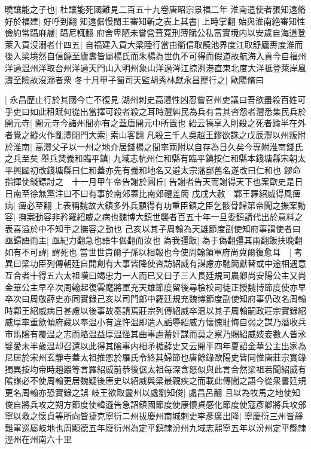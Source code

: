 曉讓能之子也|{
	杜讓能死國難見二百五十九卷唐昭宗景福二年}
淮南遣使者張知遠脩好於福建|{
	好呼到翻}
知遠倨慢閩王審知斬之表上其書|{
	上時掌翻}
始與淮南絶審知性儉約常躡麻屨|{
	躡尼輒翻}
府舍卑陋未嘗營葺寛刑薄賦公私富實境内以安歲自海道登萊入貢沒溺者什四五|{
	自福建入貢大梁陸行當由衢信取饒池界度江取舒廬夀度淮而後入梁境然自信饒至廬夀皆屬楊氏而朱楊為世仇不可得而假道故航海入貢今自福州洋過温州洋取台州洋過天門山入明州象山洋過涔江掠洌港直東北度大洋抵登萊岸風濤至險故沒溺者衆}
冬十月甲子蜀司天監胡秀林獻永昌歷行之|{
	歐陽脩曰}


|{
	永昌歷止行於其國今亡不復見}
湖州刺史高灃性凶忍嘗召州吏議曰吾欲盡殺百姓可乎吏曰如此租賦何從出當擇可殺者殺之耳時灃糾民為兵有言其咨怨者灃悉集民兵於開元寺|{
	開元寺今諸州間亦有之蓋唐開元中所置也}
紿云犒享入則殺之死者踰半在外者覺之縱火作亂灃閉門大索|{
	索山客翻}
凡殺三千人吳越王鏐欲誅之戊辰灃以州叛附於淮南|{
	高灃父子以一州之地介居錢楊之間率兩附以自存為日久矣今專附淮南錢氏之兵至矣}
舉兵焚義和臨平鎮|{
	九域志杭州仁和縣有臨平鎮按仁和縣本錢塘縣宋朝太平興國初改錢塘縣曰仁和蓋亦先有義和地名又避太宗藩邸舊名遂改曰仁和也}
鏐命指揮使錢鏢討之　十一月甲午帝告謝於圓丘|{
	告謝者告天而謝得天下也案歐史是日日南至徐無黨注曰不曰有事於南郊蓋比南郊禮差簡}
戊戌大赦　鄴王羅紹威得風痺病|{
	痺必至翻}
上表稱魏故大鎮多外兵願得有功重臣鎮之臣乞骸骨歸第帝聞之撫案動容|{
	撫案動容非矜羅紹威之病也魏博大鎮世襲者百五十年一旦委鎮請代出於意料之表喜溢於中不知手之撫容之動也}
己亥以其子周翰為天雄節度副使知府事謂使者曰亟歸語而主|{
	亟紀力翻急也語牛倨翻而汝也}
為我彊飯|{
	為于偽翻彊其兩翻飯扶晚翻}
如有不可諱|{
	謂死也}
當世世貴爾子孫以相報也今使周翰領軍府尚冀爾復愈耳　|{
	考異曰梁功臣列傳朝廷自開創有大事皆降使咨訪紹威有謀慮亦馳簡獻替或中途相遇意互合者十得五六太祖嘆曰竭忠力一人而已又曰子三人長廷規司農卿尚安陽公主又尚金華公主早卒次周翰起復雲麾將軍充天雄節度留後尋檢校司徒正授魏博節度使亦早卒次曰周敬薛史亦同實錄己亥以司門郎中羅廷規充魏博節度副使知府事仍改名周翰時鄴王紹威病日甚慮以後事故奏請焉莊宗列傳紹威卒温以其子周翰嗣政莊宗實錄紹威厚率重歛傾府藏以奉温小有違忤温即遣人詬辱紹威方懷愧耻悔自弱之謀乃潛收兵市馬隂有覆温之志而賂温益厚温怪其曲事慮蓄奸謀而莫之察乃賜紹威妓妾數人皆氶嬖愛未半歲温却召還以此得其隂事内相矛楯薛史又云開平四年夏詔金華公主出家為尼居於宋州玄靜寺蓋太祖推恩於羅氏令終其婦節也唐餘錄歐陽史皆同惟唐莊宗實錄獨異按均帝時趙巖等言羅紹威前恭後倨太祖每深含怒似與此言合然梁祖若聞紹威有隂謀必不使周翰更居魏疑後唐史以紹威與梁最親疾之而載此傳聞之語今從衆書廷規更名周翰亦恐實錄之誤}
岐王欲取靈州以處劉知俊|{
	處昌呂翻}
且以為牧馬之地使知俊自將兵攻之朔方節度使韓遜告急詔鎮國節度使康懷貞感化節度使寇彥卿將兵攻邠寧以救之懷貞等所向皆捷克寧衍二州拔慶州南城刺史李彥廣出降|{
	寧慶衍三州皆靜難軍巡屬岐地也周顯德五年廢衍州為定平鎮隸汾州九域志熙寧五年以汾州定平縣隸涇州在州南六十里}

